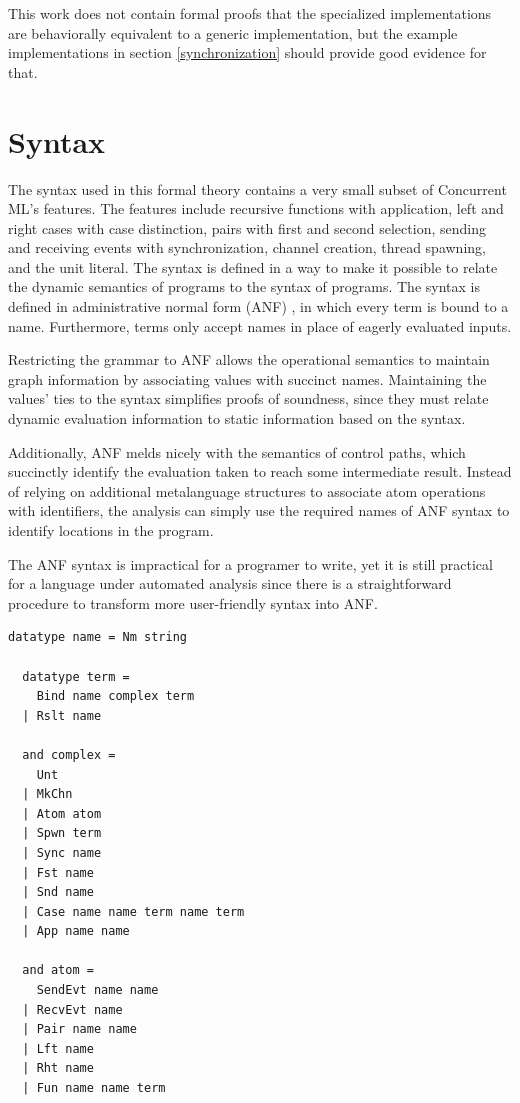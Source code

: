 \documentclass[letterpaper, 11pt]{report}
\begin{document}
This work does not contain formal proofs that the specialized implementations are
behaviorally equivalent to a generic implementation, but the example implementations in 
section \ref{synchronization} should provide good evidence for that.

\section{Syntax}
The syntax used in this formal theory contains a very small subset of
Concurrent ML's features. The features include recursive functions with
application, left and right cases with case distinction, pairs with first
and second selection, sending and receiving events with synchronization,
channel creation, thread spawning, and the unit literal. The syntax is defined in a way to
make it possible to relate the dynamic semantics of programs to the syntax of programs.
The syntax is defined in administrative normal form (ANF) \cite{flanagan1993essence}, in which every term
is bound to a name. Furthermore, terms only accept names in place of eagerly evaluated
inputs. 

Restricting the grammar to ANF allows the operational semantics
to maintain graph information by associating values with succinct names.
Maintaining the values' ties to the syntax
simplifies proofs of soundness, since they must relate dynamic evaluation information
to static information based on the syntax.

Additionally, ANF melds nicely with the semantics of control paths, which succinctly identify
the evaluation taken to reach some intermediate result.
Instead of relying on additional metalanguage structures to associate atom operations with identifiers,
the analysis can simply use the required names of ANF syntax to identify locations in the program.

The ANF syntax is impractical for a programer to write,
yet it is still practical for a language under automated analysis
since there is a straightforward procedure to transform
more user-friendly syntax into ANF.

\begin{lstlisting}[language=logic]
  datatype name = Nm string

  datatype term = 
    Bind name complex term 
  | Rslt name

  and complex = 
    Unt
  | MkChn
  | Atom atom
  | Spwn term 
  | Sync name
  | Fst name
  | Snd name
  | Case name name term name term 
  | App name name

  and atom = 
    SendEvt name name
  | RecvEvt name
  | Pair name name
  | Lft name
  | Rht name
  | Fun name name term 
\end{lstlisting}
\end{document}
